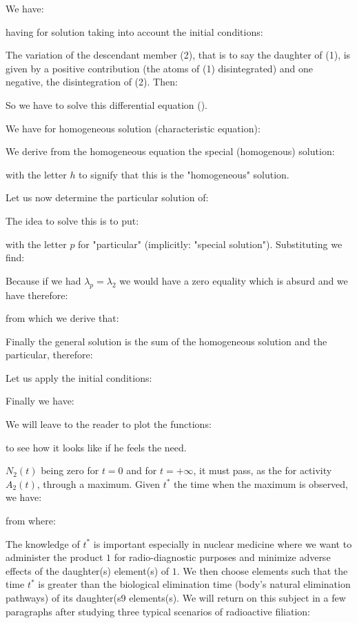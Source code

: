	We have:
	
	having for solution taking into account the initial conditions:
	
	
	The variation of the descendant member (2), that is to say the daughter of (1), is given by a positive contribution (the atoms of (1) disintegrated) and one negative, the disintegration of (2). Then:
	
	So we have to solve this differential equation ().
	
	We have for homogeneous solution (characteristic equation):
	
	We derive from the homogeneous equation the special (homogenous) solution:
	
	with the letter $h$ to signify that this is the "homogeneous" solution.

	Let us now determine the particular solution of:
	
	The idea to solve this is to put:
	
	with the letter $p$ for "particular" (implicitly: "special solution"). Substituting we find:
	
	Because if we had $\lambda_p=\lambda_2$ we would have a zero equality which is absurd and we have therefore:
	
	from which we derive that:
	
	Finally the general solution is the sum of the homogeneous solution and the particular, therefore:
	
	Let us apply the initial conditions:
	
	Finally we have:
	
	We will leave to the reader to plot the functions:
	
	to see how it looks like if he feels the need.
	
	$N_2(t)$ being zero for $t=0$ and for $t=+\infty$, it must pass, as the for activity $A_2(t)$, through a maximum. Given $t^{*}$ the time when the maximum is observed, we have:
	
	from where:
	
	The knowledge of $t^{*}$ is important especially in nuclear medicine where we want to administer the product $1$ for radio-diagnostic purposes  and minimize adverse effects of the daughter(s) element(s) of $1$. We then choose elements such that the time $t^{*}$ is greater than the biological elimination time (body's natural elimination pathways) of its daughter(s9 elements(s). We will return on this subject in a few paragraphs after studying three typical scenarios of radioactive filiation:
	
